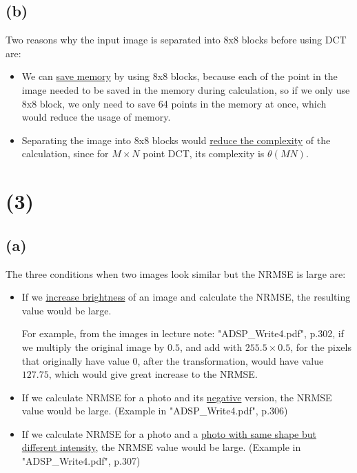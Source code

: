 \documentclass{article}
\begin{document}
\subsection*{(b)}

Two reasons why the input image is separated into 8x8 blocks before using DCT are:

\begin{itemize}
    \item We can \underline{save memory} by using 8x8 blocks, 
    because each of the point in the image needed to be saved in the memory during calculation,
    so if we only use 8x8 block, we only need to save 64 points in the memory at once,
    which would reduce the usage of memory.
    \item Separating the image into 8x8 blocks would \underline{reduce the complexity} of the calculation,
    since for $M \times N$ point DCT, its complexity is $\theta(MN)$. 
\end{itemize}


\section*{(3)}

\subsection*{(a)}

The three conditions when two images look similar but the NRMSE is large are:

\begin{itemize}
    \item If we \underline{increase brightness} of an image and calculate the NRMSE,
    the resulting value would be large.
    \bigskip

    For example, from the images in lecture note: "ADSP\_Write4.pdf", p.302,
    if we multiply the original image by $0.5$, and add with $255.5 \times 0.5$,
    for the pixels that originally have value $0$, after the transformation, would have value $127.75$,
    which would give great increase to the NRMSE.
    \item If we calculate NRMSE for a photo and its \underline{negative} version, the NRMSE value would be large. 
    (Example in "ADSP\_Write4.pdf", p.306)
    \item If we calculate NRMSE for a photo and a \underline{photo with same shape but different intensity}, the NRMSE value would be large.
    (Example in "ADSP\_Write4.pdf", p.307)
\end{itemize}
\end{document}
